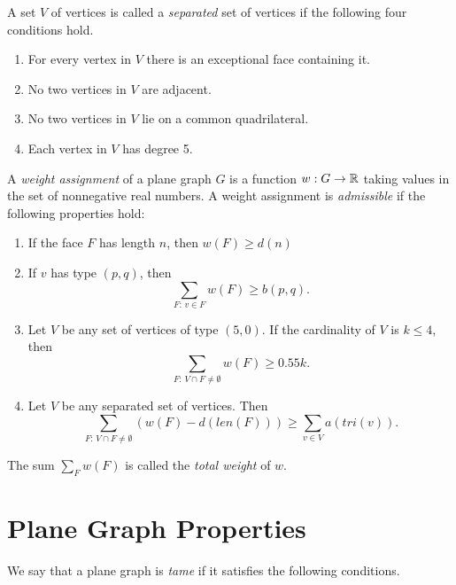 A set $V$ of vertices is called a {\it separated\/} set of
vertices if the following four conditions hold.
%
    \begin{enumerate}
      \item For every vertex in $V$ there is an exceptional face
         containing it.
      \item No two
        vertices in $V$ are adjacent.
      \item No two vertices
        in $V$ lie on a common quadrilateral.
      \item Each vertex in $V$ has degree 5.
    \end{enumerate}

%
A {\it weight assignment\/} of a plane graph $G$ is a function
$w:G\to {\mathbb R}$ taking values in the set of nonnegative real numbers. A
weight assignment is {\it admissible} if the following properties
hold:
%
\begin{enumerate}
  \item If the face $F$ has length $n$, then
        $w(F) \ge d(n)$
  \item If $v$ has type $(p,q)$, then
        $$\sum_{F:\,v\in F} w(F) \ge b(p,q).$$
        \label{admissible:b}
  \item Let $V$ be any set of vertices of type $(5,0)$.
        If the cardinality of $V$ is $k\le 4$,
        then
        $$\sum_{F:\,V\cap F\ne\emptyset} w(F) \ge 0.55 k.$$
  \item Let $V$ be any separated set of vertices.
        Then
        $$\sum_{F:\,V\cap F\ne\emptyset} (w(F) -d(len(F)))
            \ge \sum_{v\in V} a(tri(v)).$$
        \label{definition:admissible:excess}
\end{enumerate}

 The sum
$\sum_F w(F)$ is called the {\it total weight} of $w$.


\section{Plane Graph Properties}
\label{sec:graphproperty}

We say that a plane graph is {\it tame\/} if it satisfies the
following conditions.
%

